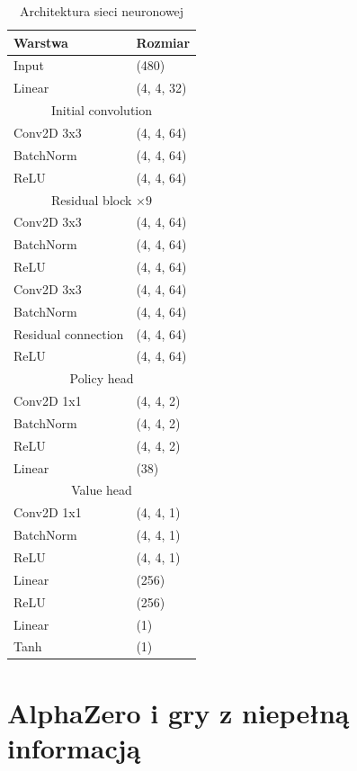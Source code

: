 \begin{table}
    \centering
    \caption{Architektura sieci neuronowej}
    \label{tab:nn-architecture}
    \begin{tabular}{ll}
        \toprule
        Warstwa & Rozmiar \\ \midrule
        Input & (480) \\
        Linear & (4, 4, 32) \\
        \midrule
        \multicolumn{2}{c}{Initial convolution} \\
        Conv2D 3x3 & (4, 4, 64) \\
        BatchNorm & (4, 4, 64) \\
        ReLU & (4, 4, 64) \\
        \midrule
        \multicolumn{2}{c}{Residual block $\times 9$} \\
        Conv2D 3x3 & (4, 4, 64) \\
        BatchNorm & (4, 4, 64) \\
        ReLU & (4, 4, 64) \\
        Conv2D 3x3 & (4, 4, 64) \\
        BatchNorm & (4, 4, 64) \\
        Residual connection & (4, 4, 64) \\
        ReLU & (4, 4, 64) \\
        \midrule
        \multicolumn{2}{c}{Policy head} \\
        Conv2D 1x1 & (4, 4, 2) \\
        BatchNorm & (4, 4, 2) \\
        ReLU & (4, 4, 2) \\
        Linear & (38) \\
        \midrule
        \multicolumn{2}{c}{Value head} \\
        Conv2D 1x1 & (4, 4, 1) \\
        BatchNorm & (4, 4, 1) \\
        ReLU & (4, 4, 1) \\
        Linear & (256) \\
        ReLU & (256) \\
        Linear & (1) \\
        Tanh & (1) \\
        \bottomrule
    \end{tabular}
\end{table}

\FloatBarrier

\section*{AlphaZero i gry z niepełną informacją}

